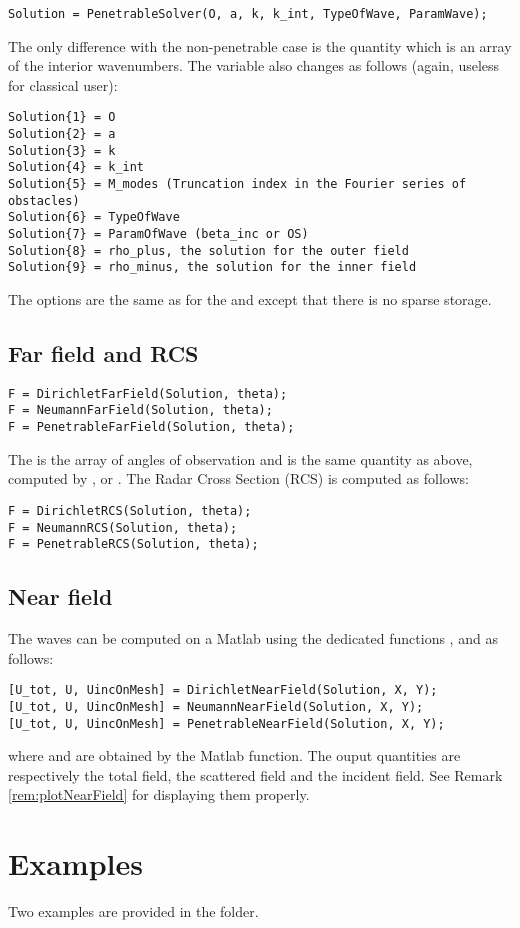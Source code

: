 \begin{lstlisting}
Solution = PenetrableSolver(O, a, k, k_int, TypeOfWave, ParamWave);
\end{lstlisting}
The only difference with the non-penetrable case is the quantity  which is an array of the interior wavenumbers. The  variable also changes as follows (again, useless for classical user):
\begin{lstlisting}
Solution{1} = O
Solution{2} = a
Solution{3} = k
Solution{4} = k_int
Solution{5} = M_modes (Truncation index in the Fourier series of obstacles)
Solution{6} = TypeOfWave
Solution{7} = ParamOfWave (beta_inc or OS)
Solution{8} = rho_plus, the solution for the outer field
Solution{9} = rho_minus, the solution for the inner field
\end{lstlisting}
The options are the same as for the \DirichletSolver and \NeumannSolver except that there is no sparse storage.

\subsection{Far field and RCS}
\label{secFun:DirichletFarField}
\label{secFun:NeumannFarField}
\label{secFun:PenetrableFarField}
\label{secFun:DirichletRCS}
\label{secFun:NeumannRCS}
\label{secFun:PenetrableRCS}

\begin{lstlisting}
F = DirichletFarField(Solution, theta);
F = NeumannFarField(Solution, theta);
F = PenetrableFarField(Solution, theta);
\end{lstlisting}
The  is the array of angles of observation and  is the same quantity as above, computed by \DirichletSolver, \NeumannSolver or \PenetrableSolver. The Radar Cross Section (RCS) is computed as follows:
\begin{lstlisting}
F = DirichletRCS(Solution, theta);
F = NeumannRCS(Solution, theta);
F = PenetrableRCS(Solution, theta);
\end{lstlisting}

\subsection{Near field}
\label{secFun:DirichletNearField}
\label{secFun:NeumannNearField}
\label{secFun:PenetrableNearField}

The waves can be computed on a Matlab  using the dedicated functions \DirichletNearField, \NeumannNearField and \PenetrableNearField as follows:
\begin{lstlisting}
[U_tot, U, UincOnMesh] = DirichletNearField(Solution, X, Y);
[U_tot, U, UincOnMesh] = NeumannNearField(Solution, X, Y);
[U_tot, U, UincOnMesh] = PenetrableNearField(Solution, X, Y);
\end{lstlisting}
where  and  are obtained by the Matlab  function. The ouput quantities are respectively the total field, the scattered field and the incident field. See Remark \ref{rem:plotNearField} for displaying them properly.


\section{Examples}

Two examples are provided in the  folder.
